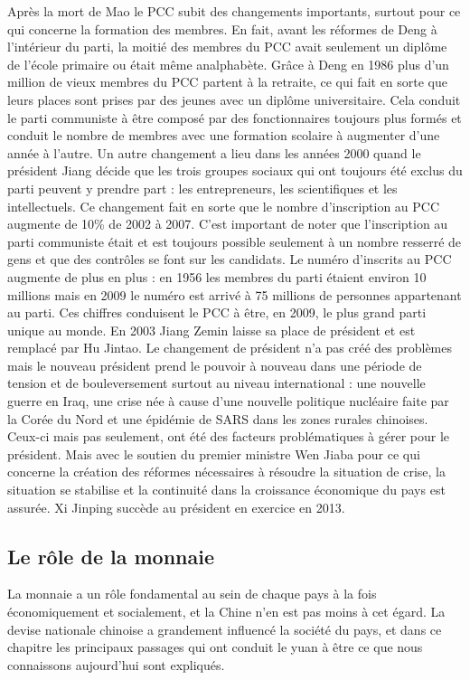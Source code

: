 Après la mort de Mao le PCC subit des changements importants, surtout pour ce qui concerne la formation des membres. En fait, avant les réformes de Deng à l’intérieur du parti, la moitié des membres du PCC avait seulement un diplôme de l’école primaire ou était même analphabète.  Grâce à Deng en 1986 plus d’un million de vieux membres du PCC partent à la retraite, ce qui fait en sorte que leurs places sont prises par des jeunes avec un diplôme universitaire. Cela conduit le parti communiste à être composé par des fonctionnaires toujours plus formés et conduit le nombre de membres avec une formation scolaire à augmenter d’une année à l’autre. Un autre changement a lieu dans les années 2000 quand le président Jiang décide que les trois groupes sociaux qui ont toujours été exclus du parti peuvent y prendre part : les entrepreneurs, les scientifiques et les intellectuels.  Ce changement fait en sorte que le nombre d’inscription au PCC augmente de 10\% de 2002 à 2007.  C’est important de noter que l’inscription au parti communiste était et est toujours possible seulement à un nombre resserré de gens et que des contrôles se font sur les candidats. Le numéro d’inscrits au PCC augmente de plus en plus : en 1956 les membres du parti étaient environ 10 millions mais en 2009 le numéro est arrivé à 75 millions de personnes appartenant au parti. Ces chiffres conduisent le PCC à être, en 2009, le plus grand parti unique au monde.  En 2003 Jiang Zemin laisse sa place de président et est remplacé par Hu Jintao.  Le changement de président n’a pas créé des problèmes mais le nouveau président prend le pouvoir à nouveau dans une période de tension et de bouleversement surtout au niveau international : une nouvelle guerre en Iraq, une crise née à cause d’une nouvelle politique nucléaire faite par la Corée du Nord et une épidémie de SARS dans les zones rurales chinoises. Ceux-ci mais pas seulement, ont été des facteurs problématiques à gérer pour le président. Mais avec le soutien du premier ministre Wen Jiaba pour ce qui concerne la création des réformes nécessaires à résoudre la situation de crise, la situation se stabilise et la continuité dans la croissance économique du pays est assurée.  Xi Jinping succède au président en exercice en 2013.

\subsection{Le rôle de la monnaie }
La monnaie a un rôle fondamental au sein de chaque pays à la fois économiquement et socialement, et la Chine n’en est pas moins à cet égard. La devise nationale chinoise a grandement influencé la société du pays, et dans ce chapitre les principaux passages qui ont conduit le yuan à être ce que nous connaissons aujourd’hui sont expliqués.
